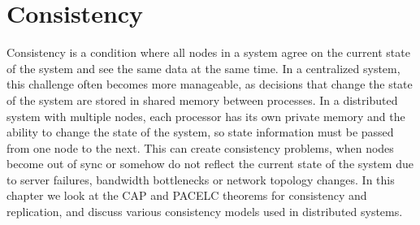 \chapter{Consistency} \label{ch:consistency}

Consistency is a condition where all nodes in a system agree on the current state of the system and see the same data at the same time. In a centralized system, this challenge often becomes more manageable, as decisions that change the state of the system are stored in shared memory between processes. In a distributed system with multiple nodes, each processor has its own private memory and the ability to change the state of the system, so state information must be passed from one node to the next. This can create consistency problems, when nodes become out of sync or somehow do not reflect the current state of the system due to server failures, bandwidth bottlenecks or network topology changes. In this chapter we look at the CAP and PACELC theorems for consistency and replication, and discuss various consistency models used in distributed systems.



